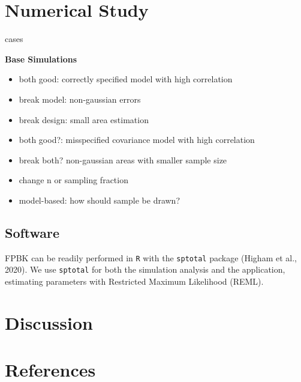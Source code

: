 \documentclass[]{elsarticle} %
\begin{document}
\hypertarget{sec:numstudy}{%
\section{Numerical Study}\label{sec:numstudy}}

cases

\textbf{Base Simulations}

\begin{itemize}
\item
  both good: correctly specified model with high correlation
\item
  break model: non-gaussian errors
\item
  break design: small area estimation
\item
  both good?: misspecified covariance model with high correlation
\item
  break both? non-gaussian areas with smaller sample size
\item
  change n or sampling fraction
\item
  model-based: how should sample be drawn?
\end{itemize}

\hypertarget{software}{%
\subsection{Software}\label{software}}

FPBK can be readily performed in \texttt{R} with the \texttt{sptotal}
package (Higham et al., 2020). We use \texttt{sptotal} for both the
simulation analysis and the application, estimating parameters with
Restricted Maximum Likelihood (REML).

\hypertarget{sec:discussion}{%
\section{Discussion}\label{sec:discussion}}

\hypertarget{references}{%
\section*{References}\label{references}}
\end{document}
